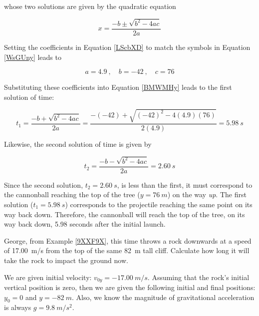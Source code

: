 \documentclass[main.tex]{subfiles}
\begin{document}
whose two solutions are given by the quadratic equation

\begin{equation} \label{BMWMHy}
    x = \frac{-b \pm \sqrt{b^2 - 4ac}}{2a}
\end{equation}

Setting the coefficients in Equation \eqref{LScbXD} to match the symbols in Equation \eqref{WsGUny} leads to 

\begin{equation*}
    a = 4.9\ , \quad b = -42\ ,\quad c = 76
\end{equation*}

Substituting these coefficients into Equation \eqref{BMWMHy} leads to the first solution of time:

\begin{equation*}
    t_1 = \frac{-b + \sqrt{b^2 - 4ac}}{2a} = \frac{-(-42) + \sqrt{(-42)^2 - 4 (4.9)(76)}}{2(4.9)} = \SI{5.98}{s}
\end{equation*}

Likewise, the second solution of time is given by

\begin{equation*}
    t_2 = \frac{-b - \sqrt{b^2 - 4ac}}{2a} = \SI{2.60}{s}
\end{equation*}

Since the second solution, $t_2 = \SI{2.60}{s}$, is less than the first, it must correspond to the cannonball reaching the top of the tree ($y=\SI{76}{m}$) on the way \textit{up}. The first solution ($t_1 = \SI{5.98}{s}$) corresponds to the projectile reaching the same point on its way back down. Therefore, the cannonball will reach the top of the tree, on its way back down, 5.98 seconds after the initial launch.

\endsolution


\begin{example} \label{pyn6Go}
    George, from Example \ref{9XXF9X}, this time throws a rock downwards at a speed of \SI{17.00}{m/s} from the top of the same \SI{82}{m} tall cliff. Calculate how long it will take the rock to impact the ground now.
\end{example}

\Solution We are given initial velocity: $v_{0y} = \SI{-17.00}{m/s}$. Assuming that the rock's initial vertical position is zero, then we are given the following initial and final positions: $y_0 = 0$ and $y = \SI{-82}{m}$. Also, we know the magnitude of gravitational acceleration is always $g = \SI{9.8}{m/s^2}$. 
\end{document}
